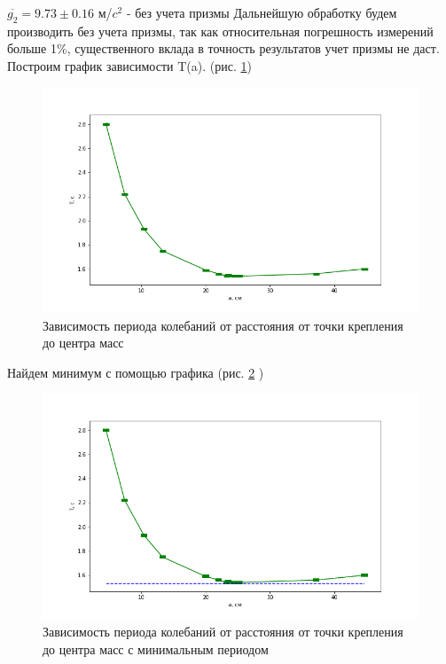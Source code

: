 \documentclass[a4paper,12pt]{article} %
\begin{document}
$\overline{g_2} =9.73 \pm 0.16$ м/$c^2$ - без учета призмы
Дальнейшую обработку будем производить без учета призмы, так как относительная погрешность измерений больше 1\%, существенного вклада в точность результатов учет призмы не даст.
Построим график зависимости T(a). (рис. \ref{T(a)})
\begin{figure}[h!]
\begin{center}
\includegraphics[width=\textwidth]{T(a)}
\end{center}
\caption{Зависимость периода колебаний от расстояния от точки крепления до центра масс} \label{T(a)}
\end{figure}

Найдем минимум с помощью графика (рис. \ref{T(a)+min} )
\begin{figure}[h!]
\begin{center}
\includegraphics[width=\textwidth]{T(a)+min}
\end{center}
\caption{Зависимость периода колебаний от расстояния от точки крепления до центра масс с минимальным периодом} \label{T(a)+min}
\end{figure}
\end{document}
